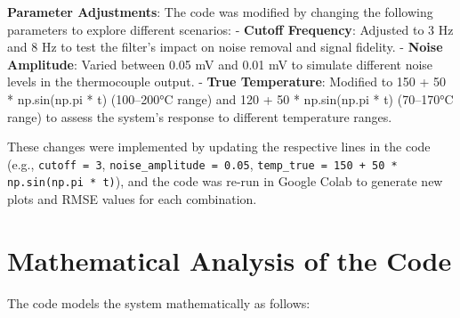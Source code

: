 \documentclass[12pt]{article}
\begin{document}
\textbf{Parameter Adjustments}: The code was modified by changing the following parameters to explore different scenarios:
- \textbf{Cutoff Frequency}: Adjusted to 3 Hz and 8 Hz to test the filter's impact on noise removal and signal fidelity.
- \textbf{Noise Amplitude}: Varied between 0.05 mV and 0.01 mV to simulate different noise levels in the thermocouple output.
- \textbf{True Temperature}: Modified to 150 + 50 * np.sin(np.pi * t) (100–200°C range) and 120 + 50 * np.sin(np.pi * t) (70–170°C range) to assess the system's response to different temperature ranges.

These changes were implemented by updating the respective lines in the code (e.g., \texttt{cutoff = 3}, \texttt{noise\_amplitude = 0.05}, \texttt{temp\_true = 150 + 50 * np.sin(np.pi * t)}), and the code was re-run in Google Colab to generate new plots and RMSE values for each combination.

\section*{Mathematical Analysis of the Code}
The code models the system mathematically as follows:
\end{document}
